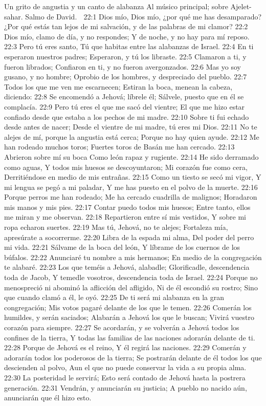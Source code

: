 Un grito de angustia y un canto de alabanza 
Al músico principal; sobre Ajelet-sahar. Salmo de David. 

22:1 Dios mío, Dios mío, ¿por qué me has desamparado? 
¿Por qué estás tan lejos de mi salvación, y de las palabras de mi clamor? 
22:2 Dios mío, clamo de día, y no respondes; 
Y de noche, y no hay para mí reposo. 
22:3 Pero tú eres santo, 
Tú que habitas entre las alabanzas de Israel. 
22:4 En ti esperaron nuestros padres; 
Esperaron, y tú los libraste. 
22:5 Clamaron a ti, y fueron librados; 
Confiaron en ti, y no fueron avergonzados. 
22:6 Mas yo soy gusano, y no hombre; 
Oprobio de los hombres, y despreciado del pueblo. 
22:7 Todos los que me ven me escarnecen; 
Estiran la boca, menean la cabeza,  diciendo: 
22:8 Se encomendó a Jehová; líbrele él; 
Sálvele, puesto que en él se complacía. 
22:9 Pero tú eres el que me sacó del vientre; 
El que me hizo estar confiado desde que estaba a los pechos de mi madre. 
22:10 Sobre ti fui echado desde antes de nacer; 
Desde el vientre de mi madre, tú eres mi Dios. 
22:11 No te alejes de mí, porque la angustia está cerca; 
Porque no hay quien ayude. 
22:12 Me han rodeado muchos toros; 
Fuertes toros de Basán me han cercado. 
22:13 Abrieron sobre mí su boca 
Como león rapaz y rugiente. 
22:14 He sido derramado como aguas, 
Y todos mis huesos se descoyuntaron; 
Mi corazón fue como cera, 
Derritiéndose en medio de mis entrañas. 
22:15 Como un tiesto se secó mi vigor, 
Y mi lengua se pegó a mi paladar, 
Y me has puesto en el polvo de la muerte. 
22:16 Porque perros me han rodeado; 
Me ha cercado cuadrilla de malignos; 
Horadaron mis manos y mis pies. 
22:17 Contar puedo todos mis huesos; 
Entre tanto, ellos me miran y me observan. 
22:18 Repartieron entre sí mis vestidos, 
Y sobre mi ropa echaron suertes. 
22:19 Mas tú, Jehová, no te alejes; 
Fortaleza mía, apresúrate a socorrerme. 
22:20 Libra de la espada mi alma, 
Del poder del perro mi vida. 
22:21 Sálvame de la boca del león, 
Y líbrame de los cuernos de los búfalos. 
22:22 Anunciaré tu nombre a mis hermanos; 
En medio de la congregación te alabaré. 
22:23 Los que teméis a Jehová, alabadle; 
Glorificadle, descendencia toda de Jacob, 
Y temedle vosotros, descendencia toda de Israel. 
22:24 Porque no menospreció ni abominó la aflicción del afligido, 
Ni de él escondió su rostro; 
Sino que cuando clamó a él, le oyó. 
22:25 De ti será mi alabanza en la gran congregación; 
Mis votos pagaré delante de los que le temen. 
22:26 Comerán los humildes, y serán saciados; 
Alabarán a Jehová los que le buscan; 
Vivirá vuestro corazón para siempre. 
22:27 Se acordarán, y se volverán a Jehová todos los confines de la tierra, 
Y todas las familias de las naciones adorarán delante de ti. 
22:28 Porque de Jehová es el reino, 
Y él regirá las naciones. 
22:29 Comerán y adorarán todos los poderosos de la tierra; 
Se postrarán delante de él todos los que descienden al polvo, 
Aun el que no puede conservar la vida a su propia alma. 
22:30 La posteridad le servirá; 
Esto será contado de Jehová hasta la postrera generación. 
22:31 Vendrán, y anunciarán su justicia; 
A pueblo no nacido aún, anunciarán que él hizo esto. 

